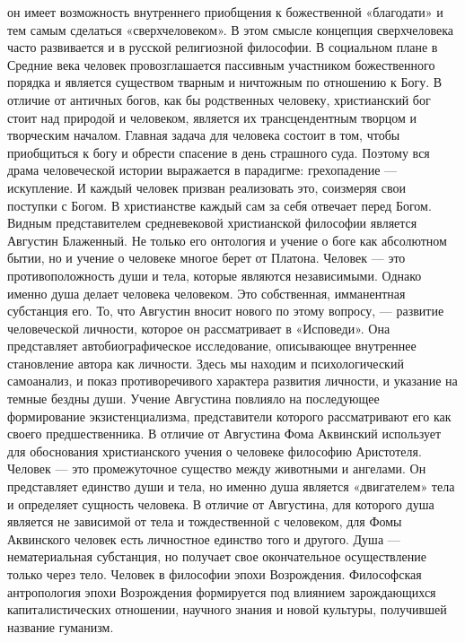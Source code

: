 \documentclass[12pt]{article}
\begin{document}
он  имеет  возможность  внутреннего  приобщения  к  божественной  «благодати»  и  тем  самым  сделаться
«сверхчеловеком».  В  этом  смысле  концепция  сверхчеловека  часто  развивается  и  в  русской  религиозной
философии.
В социальном плане в Средние века человек провозглашается пассивным участником божественного порядка и
является  существом  тварным  и  ничтожным  по  отношению  к  Богу.  В  отличие  от  античных  богов,  как  бы
родственных  человеку,  христианский  бог  стоит  над  природой  и  человеком,  является  их  трансцендентным
творцом и творческим началом. Главная задача для человека состоит в том, чтобы приобщиться к богу и
обрести спасение в день страшного суда. Поэтому вся драма человеческой истории выражается в парадигме:
грехопадение — искупление. И каждый человек призван реализовать это, соизмеряя свои поступки с Богом. В
христианстве каждый сам за себя отвечает перед Богом.
Видным представителем средневековой христианской философии является Августин Блаженный. Не только его
онтология и учение о боге как абсолютном бытии, но и учение о человеке многое берет от Платона. Человек —
это противоположность души и тела, которые являются независимыми. Однако именно душа делает человека
человеком. Это собственная, имманентная субстанция его. То, что Августин вносит нового по этому вопросу, —
развитие  человеческой  личности,  которое  он  рассматривает  в  «Исповеди».  Она  представляет
автобиографическое  исследование,  описывающее  внутреннее  становление  автора  как  личности.  Здесь  мы
находим и психологический самоанализ, и показ противоречивого характера развития личности, и указание на
темные  бездны  души.  Учение  Августина  повлияло  на  последующее  формирование  экзистенциализма,
представители которого рассматривают его как своего предшественника.
В  отличие  от  Августина  Фома  Аквинский  использует  для  обоснования  христианского  учения  о  человеке
философию  Аристотеля.  Человек  —  это  промежуточное  существо  между  животными  и  ангелами.  Он
представляет  единство  души  и  тела,  но  именно  душа  является  «двигателем»  тела  и  определяет  сущность
человека.  В  отличие  от  Августина,  для  которого  душа  является  не  зависимой  от  тела  и  тождественной  с
человеком, для Фомы Аквинского человек есть личностное единство того и другого. Душа — нематериальная
субстанция, но получает свое окончательное осуществление только через тело.
Человек в философии эпохи Возрождения.
Философская антропология эпохи Возрождения формируется под влиянием зарождающихся капиталистических
отношении, научного знания и новой культуры, получившей название гуманизм.
\end{document}
